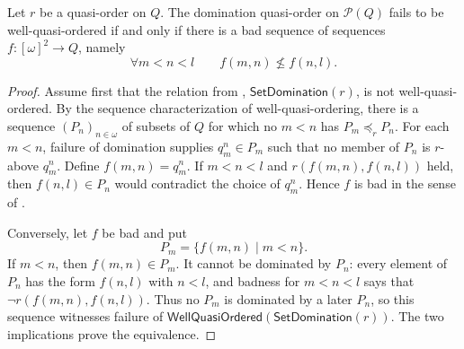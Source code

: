 \begin{lemma}
Let $r$ be a quasi-order on $Q$.  The domination quasi-order on
$\mathcal P(Q)$ fails to be well-quasi-ordered if and only if there is a
bad sequence of sequences $f:[\omega]^2\to Q$, namely
\[
\forall m<n<l\qquad f(m,n)\nleq f(n,l).
\]
\end{lemma}
\begin{proof}
Assume first that the relation from ,
$\mathsf{SetDomination}(r)$, is not well-quasi-ordered.
By the sequence characterization of well-quasi-ordering, there is a
sequence $(P_n)_{n\in\omega}$ of subsets of $Q$ for which no $m<n$ has
$P_m\preceq_r P_n$.  For each $m<n$, failure of domination supplies
$q_m^n\in P_m$ such that no member of $P_n$ is $r$-above $q_m^n$.
Define $f(m,n)=q_m^n$.  If $m<n<l$ and
$r(f(m,n),f(n,l))$ held, then $f(n,l)\in P_n$ would contradict the
choice of $q_m^n$.  Hence $f$ is bad in the sense of
.

Conversely, let $f$ be bad and put
\[
P_m=\{f(m,n)\mid m<n\}.
\]
If $m<n$, then $f(m,n)\in P_m$.  It cannot be dominated by $P_n$:
every element of $P_n$ has the form $f(n,l)$ with $n<l$, and badness
for $m<n<l$ says that
$\neg r(f(m,n),f(n,l))$.  Thus no $P_m$ is dominated by a later
$P_n$, so this sequence witnesses failure of
$\mathsf{WellQuasiOrdered}(\mathsf{SetDomination}(r))$.
The two implications prove the equivalence.
\end{proof}
